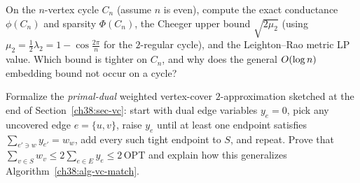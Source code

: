 \begin{exercise}\label{ch38:ex-cheeger-vs-lr}
On the $n$-vertex cycle $C_n$ (assume $n$ is even), compute the exact conductance $\phi(C_n)$ and sparsity
$\Phi(C_n)$, the Cheeger upper bound $\sqrt{2\mu_2}$ (using $\mu_2 = \tfrac12\lambda_2 = 1-\cos\tfrac{2\pi}{n}$
for the $2$-regular cycle), and the Leighton--Rao metric LP value. Which bound is tighter on $C_n$, and why
does the general $O(\log n)$ embedding bound not occur on a cycle?
\end{exercise}

\begin{exercise}\label{ch38:ex-primal-dual-vc}
Formalize the \emph{primal-dual} weighted vertex-cover $2$-approximation sketched at the end of Section~\ref{ch38:sec-vc}:
start with dual edge variables $y_e=0$, pick any uncovered edge $e=\{u,v\}$, raise $y_e$ until at least one
endpoint satisfies $\sum_{e'\ni w} y_{e'} = w_w$, add every such tight endpoint to $S$, and repeat. Prove
that $\sum_{v\in S} w_v \le 2\sum_{e\in E} y_e \le 2\,\mathrm{OPT}$ and explain how this generalizes
Algorithm~\ref{ch38:alg-vc-match}.
\end{exercise}
